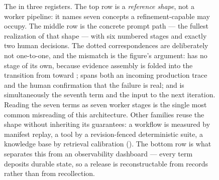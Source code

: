 \begin{figure}[tbp]
\begin{cbwide}
\begin{tikzpicture}[x=1cm,y=1cm]
\end{tikzpicture}
\end{cbwide}
\caption{The \chainname{} in three registers. The top row is a \emph{reference
shape}, not a worker pipeline: it names seven concepts a refinement-capable
\family may occupy. The middle row is the concrete prompt path --- the fullest
realization of that shape --- with six numbered stages and exactly two human
decisions. The dotted correspondences are deliberately not one-to-one, and the
mismatch is the figure's argument: \cEvidence{} has no stage of its own, because
evidence assembly is folded into the transition from  toward
; \cSignal{} spans both an incoming production trace and the human
confirmation that the failure is real; and \cTrace{} is simultaneously the
seventh term and the input to the next iteration. Reading the seven terms as
seven worker stages is the single most common misreading of this architecture.
Other families reuse the shape without inheriting its guarantees: a workflow is
measured by manifest replay, a tool by a revision-fenced deterministic suite, a
knowledge base by retrieval calibration (). The bottom row
is what separates this from an observability dashboard --- every term deposits
durable state, so a release is reconstructable from records rather than from
recollection.}
\label{fig:chain}
\figkey
\end{figure}

